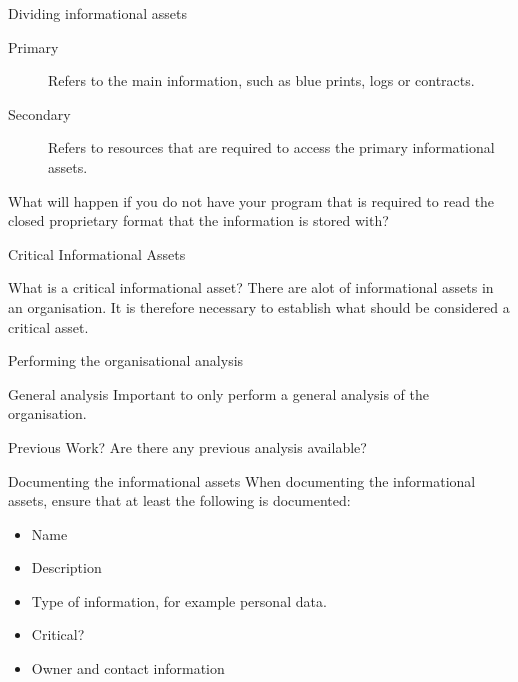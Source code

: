 \documentclass{beamer}
\begin{document}
\begin{frame}{Dividing informational assets}{\insertsubsubsectionhead}
  \begin{description}
    \item[Primary] Refers to the main information, such as blue prints, logs or
      contracts.
    \item[Secondary] Refers to resources that are required to access the primary
      informational assets.
  \end{description}
  What will happen if you do not have your program that is required to read the
  closed proprietary format that the information is stored with?
\end{frame}
\begin{frame}{Critical Informational Assets}
  \centering
  \begin{block}{What is a critical informational asset?}
    There are alot of informational assets in an organisation. It is therefore
    necessary to establish what should be considered a critical asset.
  \end{block}
\end{frame}

\begin{frame}{Performing the organisational analysis}{\insertsubsubsectionhead}
  \begin{block}{General analysis}
    Important to only perform a general analysis of the organisation.
  \end{block}
  \begin{block}{Previous Work?}
    Are there any previous analysis available?
  \end{block}
\end{frame}

\begin{frame}{Documenting the informational assets}
  When documenting the informational assets, ensure that at least the following
  is documented:
  \begin{itemize}
    \item Name
    \item Description
    \item Type of information, for example personal data.
    \item Critical?
    \item Owner and contact information
  \end{itemize}
\end{frame}
\end{document}
